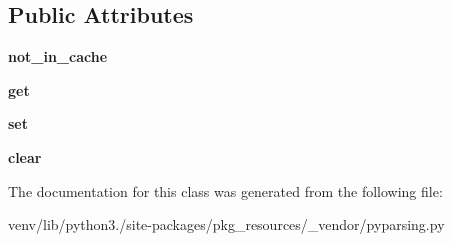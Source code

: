 \subsection*{Public Attributes}
\begin{DoxyCompactItemize}
\item 
\mbox{\label{classpkg__resources_1_1__vendor_1_1pyparsing_1_1_parser_element_1_1___fifo_cache_aed42e713127a24dfe935e06b73f5bd85}} 
{\bfseries not\+\_\+in\+\_\+cache}
\item 
\mbox{\label{classpkg__resources_1_1__vendor_1_1pyparsing_1_1_parser_element_1_1___fifo_cache_ac3691720f1a3a605e9b7c6cc302d1ac6}} 
{\bfseries get}
\item 
\mbox{\label{classpkg__resources_1_1__vendor_1_1pyparsing_1_1_parser_element_1_1___fifo_cache_a8f44f4902b3f63b9b40e39e095392eea}} 
{\bfseries set}
\item 
\mbox{\label{classpkg__resources_1_1__vendor_1_1pyparsing_1_1_parser_element_1_1___fifo_cache_a2159afe84250e537b026ffa172ad553d}} 
{\bfseries clear}
\end{DoxyCompactItemize}


The documentation for this class was generated from the following file\+:\begin{DoxyCompactItemize}
\item 
venv/lib/python3./site-\/packages/pkg\+\_\+resources/\+\_\+vendor/pyparsing.\+py\end{DoxyCompactItemize}
